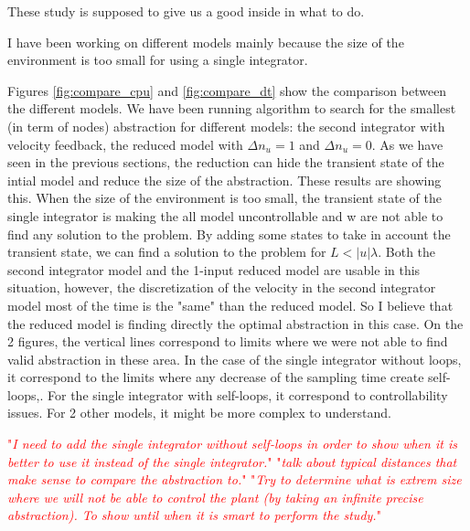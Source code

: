 \documentclass{article}
\theoremstyle{named}
\newcommand\comment[1]{\textcolor{red}{"\textit{#1}"}}
\begin{document}
These study is supposed to give us a good inside in what to do.

I have been working on different models mainly because the size of the environment is  too small for using a single integrator.


Figures \ref{fig:compare_cpu} and \ref{fig:compare_dt} show the comparison between the different models. We have been running algorithm to search for the smallest (in term of nodes) abstraction for different models: the second integrator with velocity feedback, the reduced model with $\Delta n_u = 1$ and $\Delta n_u = 0$.
As we have seen in the previous sections, the reduction can hide the transient state of the intial model and reduce the size of the abstraction.
These results are showing this.
When the size of the environment is too small, the transient state of the single integrator is making the all model uncontrollable and w are not able to find any solution to the problem.
By adding some states to take in account the transient state, we can find a solution to the problem for $L<|u| \lambda$. Both the second integrator model and the 1-input reduced model are usable in this situation, however, the discretization of the velocity in the second integrator model most of the time is the "same" than the reduced model. So I believe that the reduced model is finding directly the optimal abstraction in this case.
On the 2 figures, the vertical lines correspond to limits where we were not able to find valid abstraction in these area. In the case of the single integrator without loops, it correspond to the limits where any decrease of the sampling time create self-loops,. For the single integrator with self-loops, it correspond to controllability issues. For 2 other models, it might be more complex to understand.

\comment{I need to add the single integrator without self-loops in order to show when it is better to use it instead of the single integrator.}
\comment{talk about typical distances that make sense to compare the abstraction to.}
\comment{Try to determine what is extrem size where we will not be able to control the plant (by taking an infinite precise abstraction). To show until when it is smart to perform the study.}
\end{document}
